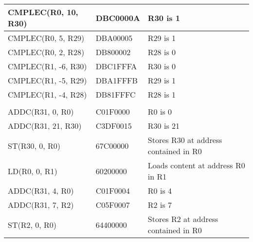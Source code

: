 \documentclass[a4paper, 11pt, oneside]{article}
\begin{document}
\begin{table}[!ht]
\begin{tabular}{|l|l|l|}
CMPLEC(R0, 10, R30)                        & DBC0000A                                  & R30 is 1                              \\ \hline
CMPLEC(R0, 5, R29)                         & DBA00005                                  & R29 is 1                              \\ \hline
CMPLEC(R0, 2, R28)                         & DB800002                                  & R28 is 0                              \\ \hline
CMPLEC(R1, -6, R30)                        & DBC1FFFA                                  & R30 is 0                              \\ \hline
CMPLEC(R1, -5, R29)                        & DBA1FFFB                                  & R29 is 1                              \\ \hline
CMPLEC(R1, -4, R28)                        & DB81FFFC                                  & R28 is 1                              \\ \hline
                                           &                                           &                                       \\ \hline
ADDC(R31, 0, R0)                           & C01F0000                                  & R0 is 0                               \\ \hline
ADDC(R31, 21, R30)                         & C3DF0015                                  & R30 is 21                             \\ \hline
ST(R30, 0, R0)                             & 67C00000                                  & Stores R30 at address contained in R0 \\ \hline
LD(R0, 0, R1)                              & 60200000                                  & Loads content at address R0 in R1     \\ \hline
ADDC(R31, 4, R0)                           & C01F0004                                  & R0 is 4                               \\ \hline
ADDC(R31, 7, R2)                           & C05F0007                                  & R2 is 7                               \\ \hline
ST(R2, 0, R0)                              & 64400000                                  & Stores R2 at address contained in R0  \\ \hline
\end{tabular}
\end{table}
\end{document}
